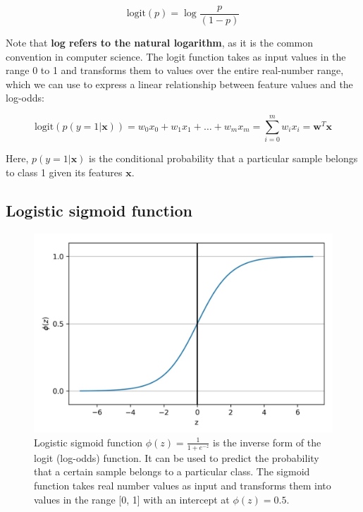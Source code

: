 \documentclass[11pt]{article}
\newcommand{\vect}[1]{\boldsymbol{#1}}
\begin{document}
    \begin{equation}
        \label{eq:logit}
        \text{logit}(p) = \log \frac{p} {(1-p)}
    \end{equation}

    Note that \textbf{log refers to the natural logarithm}, as it is the common convention in computer science.
    The logit function takes as input values in the range 0 to 1 and transforms them to values over the entire real-number range, which we can use to express a linear relationship between feature values and the log-odds:

    \begin{equation}
        \label{eq:lr_logit}
        \text{logit}( p( y = 1 | \vect{x} ) ) =
        w_0 x_0 + w_1 x_1 + \dots + w_m x_m = \sum \limits_{i=0}^m w_i x_i =
        \vect{w}^T \vect{x}
    \end{equation}

    Here, $p( y = 1 | \vect{x} )$ is the conditional probability that a particular sample belongs to class 1 given its features $\vect{x}$.

    \subsection{Logistic sigmoid function} \label{subsec:lr_sigmoid}

    \begin{figure}[hbt!]
        \centering
        \includegraphics[width=1\linewidth,trim=4 4 4 4,clip]{img/sigmoid.png}
        \caption{Logistic sigmoid function $\phi(z) = \frac{1} {1 + e^{-z}}$ is the inverse form of the logit (log-odds) function.
        It can be used to predict the probability that a certain sample belongs to a particular class.
        The sigmoid function takes real number values as input and transforms them into values in the range [0, 1] with an intercept at $\phi(z) = 0.5$.}
        \label{fig:sigmoid}
    \end{figure}
\end{document}
